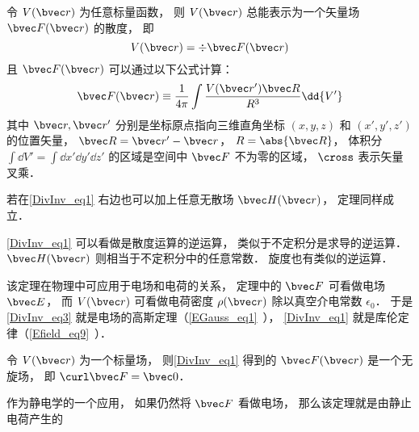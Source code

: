 

\begin{theorem}{}
令 $V(\bvec r)$ 为任意标量函数， 则 $V(\bvec r)$ 总能表示为一个矢量场 $\bvec F(\bvec r)$ 的散度， 即
\begin{equation}\label{DivInv_eq3}
V(\bvec r) = \div \bvec F(\bvec r)
\end{equation}
且 $\bvec F(\bvec r)$ 可以通过以下公式计算：
\begin{equation}\label{DivInv_eq1}
\bvec F(\bvec r) \equiv \frac{1}{4\pi}\int \frac{V(\bvec r') \bvec R}{R^3} \dd{V'}
\end{equation}
其中 $\bvec r, \bvec r'$ 分别是坐标原点指向三维直角坐标 $(x, y, z)$ 和 $(x', y', z')$ 的位置矢量， $\bvec R = \bvec r' - \bvec r$， $R = \abs{\bvec R}$， 体积分 $\int\dd{V'} = \int\dd{x'}\dd{y'}\dd{z'}$ 的区域是空间中 $\bvec F$ 不为零的区域， $\cross$ 表示矢量叉乘．

若在\autoref{DivInv_eq1} 右边也可以加上任意无散场 $\bvec H(\bvec r)$， 定理同样成立．
\end{theorem}

\autoref{DivInv_eq1} 可以看做是散度运算的逆运算， 类似于不定积分是求导的逆运算． $\bvec H(\bvec r)$ 则相当于不定积分中的任意常数． 旋度也有类似的逆运算．

该定理在物理中可应用于电场和电荷的关系， 定理中的 $\bvec F$ 可看做电场 $\bvec E$， 而 $V(\bvec r)$ 可看做电荷密度 $\rho(\bvec r)$ 除以真空介电常数 $\epsilon_0$． 于是\autoref{DivInv_eq3} 就是电场的高斯定理（\autoref{EGauss_eq1}~）， \autoref{DivInv_eq1} 就是库伦定律（\autoref{Efield_eq9}~）．

\begin{theorem}{}
令 $V(\bvec r)$ 为一个标量场， 则\autoref{DivInv_eq1} 得到的 $\bvec F(\bvec r)$ 是一个无旋场， 即 $\curl \bvec F = \bvec 0$．
\end{theorem}

作为静电学的一个应用， 如果仍然将 $\bvec F$ 看做电场， 那么该定理就是由静止电荷产生的

